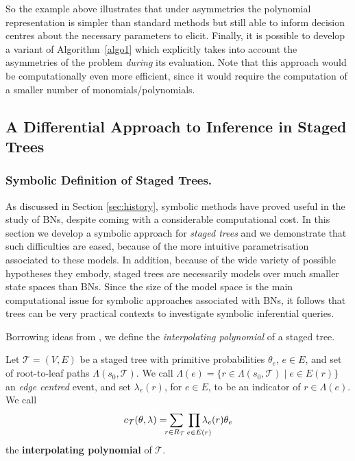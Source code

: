 {So the example above illustrates that under asymmetries the polynomial representation is simpler than standard methods but still able to inform decision centres about the necessary parameters to elicit.  Finally, it is possible to develop a variant of Algorithm~\ref{algo1} which explicitly takes into account the asymmetries of the problem \textit{during} its evaluation.  Note that this approach  would  be  computationally even more efficient, since it would require the computation of a smaller number of monomials/polynomials.
 
\subsection{A Differential Approach to Inference in Staged Trees}
\label{sec:diff}

\subsubsection{Symbolic Definition of Staged Trees.}
As discussed in Section \ref{sec:history}, symbolic methods have proved useful in the study of BNs, despite coming with a considerable computational cost. In this section we develop a symbolic approach for \textit{staged trees} \citep[see e.g.][and Section \ref{sec:tree}]{Smith2008} and we demonstrate that such difficulties are eased, because of the more intuitive parametrisation associated to these models. In addition, because of the wide variety of possible hypotheses they embody, staged trees are necessarily models over much smaller state spaces than BNs. Since the size of the model space is the main computational issue for symbolic approaches associated with BNs, it follows that trees can be very practical contexts to investigate symbolic inferential queries.

Borrowing ideas from  \citet{Pistone2001}, we define the \textit{interpolating polynomial} of a staged tree.

\begin{definition}\label{def:interpol}
Let $\mathcal{T}=(V,E)$ be a staged tree with primitive probabilities $\theta_e$, $e\in E$, and set of root-to-leaf paths $\Lambda(s_0,\mathcal{T})$. We call $\Lambda(e)=\{r\in\Lambda(s_0,\mathcal{T})\;|\; e\in E(r)\}$ an \emph{edge centred} event, and set 
$\lambda_e(r)$, for $e\in E$, to be an indicator of $r\in\Lambda(e)$. We call
\begin{equation*}\label{eq:interpol}
c_{\mathcal{T}}(\theta,\lambda)=\sum_{\mathclap{r\in R_\mathcal{T}~}}~\prod_{\mathclap{\quad e\in E(r)}}\lambda_e(r)\theta_e
\end{equation*}
the \textbf{interpolating polynomial} of $\mathcal{T}$.
\end{definition}

}
